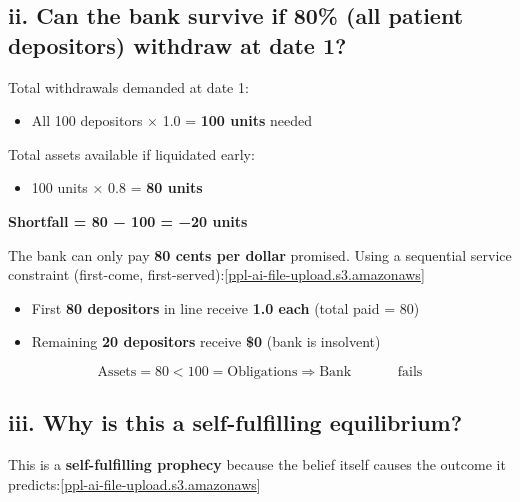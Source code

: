 \documentclass[a4paper]{article}
\begin{document}
\hypertarget{ii.-can-the-bank-survive-if-80-all-patient-depositors-withdraw-at-date-1}{%
\subsection{ii. Can the bank survive if 80\% (all patient depositors)
withdraw at date
1?}\label{ii.-can-the-bank-survive-if-80-all-patient-depositors-withdraw-at-date-1}}

Total withdrawals demanded at date 1:

\begin{itemize}
\item
  All 100 depositors × 1.0 = \textbf{100 units} needed
\end{itemize}

Total assets available if liquidated early:

\begin{itemize}
\item
  100 units × 0.8 = \textbf{80 units}
\end{itemize}

\textbf{Shortfall = 80 − 100 = −20 units}

The bank can only pay \textbf{80 cents per dollar} promised. Using a
sequential service constraint (first-come,
first-served):{[}\href{https://ppl-ai-file-upload.s3.amazonaws.com/web/direct-files/attachments/64012734/8ecdf432-f8fa-409d-b72d-017134eed977/Homework1.pdf}{ppl-ai-file-upload.s3.amazonaws}{]}\hspace{0pt}

\begin{itemize}
\item
  First \textbf{80 depositors} in line receive \textbf{1.0 each} (total
  paid = 80)
\item
  Remaining \textbf{20 depositors} receive \textbf{\$0} (bank is
  insolvent)
\end{itemize}

\[\text{Assets} = 80 < 100 = \text{Obligations} \Rightarrow \text{Bank\ }\text{	}\text{	}\text{	}\text{	}\text{	fails}\]

\hypertarget{iii.-why-is-this-a-self-fulfilling-equilibrium}{%
\subsection{iii. Why is this a self-fulfilling
equilibrium?}\label{iii.-why-is-this-a-self-fulfilling-equilibrium}}

This is a \textbf{self-fulfilling prophecy} because the belief itself
causes the outcome it
predicts:{[}\href{https://ppl-ai-file-upload.s3.amazonaws.com/web/direct-files/attachments/64012734/8ecdf432-f8fa-409d-b72d-017134eed977/Homework1.pdf}{ppl-ai-file-upload.s3.amazonaws}{]}\hspace{0pt}
\end{document}
